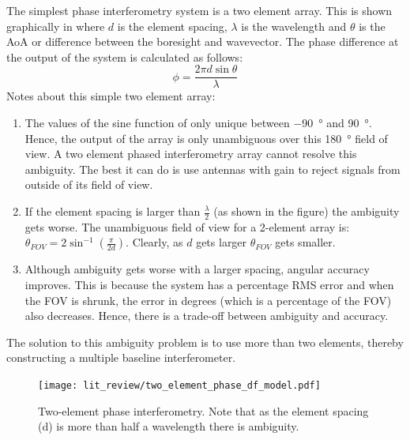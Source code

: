 The simplest phase interferometry system is a two element array. This is shown graphically in  where \(d\) is the element spacing, \(\lambda\) is the wavelength and \(\theta\) is the AoA or difference between the boresight and wavevector.
The phase difference at the output of the system is calculated as follows:
\begin{equation}
\phi = \frac{2 \pi d \sin \theta}{\lambda}
\end{equation}
Notes about this simple two element array:
\begin{enumerate}
  \item The values of the sine function of only unique between \SI{-90}{\degree} and \SI{90}{\degree}. Hence, the output of the array is only unambiguous over this \SI{180}{\degree} field of view. A two element phased interferometry array cannot resolve this ambiguity. The best it can do is use antennas with gain to reject signals from outside of its field of view.
  \item If the element spacing is larger than \(\frac{\lambda}{2}\) (as shown in the figure) the ambiguity gets worse. The unambiguous field of view for a 2-element array is: \(\theta_{FOV} = 2 \sin^{-1}(\frac{\pi}{2d})\). Clearly, as \(d\) gets larger \(\theta_{FOV}\) gets smaller. 
  \item Although ambiguity gets worse with a larger spacing, angular accuracy improves. This is because the system has a percentage RMS error and when the FOV is shrunk, the error in degrees (which is a percentage of the FOV) also decreases. Hence, there is a trade-off between ambiguity and accuracy.
\end{enumerate}
The solution to this ambiguity problem is to use more than two elements, thereby constructing a multiple baseline interferometer. 

\begin{figure}
   \centering
   \texttt{[image: lit\_review/two\_element\_phase\_df\_model.pdf]}
   \caption{Two-element phase interferometry. Note that as the element spacing (d) is more than half a wavelength there is ambiguity.}
   \label{fig:lit-two-element-phase}
\end{figure}

